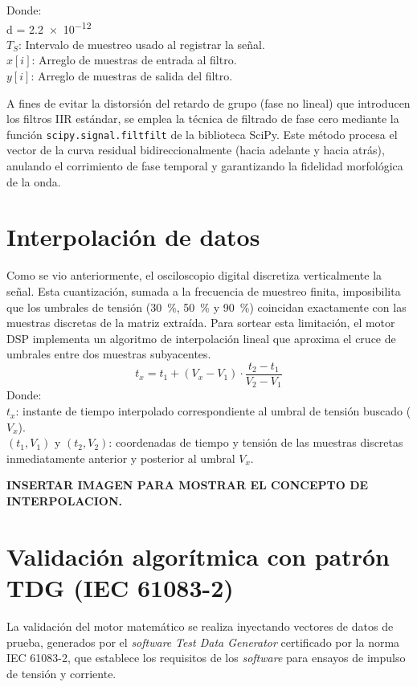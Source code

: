 \noindent Donde:\\
d = \SI{2.2e-12}{}\\
$T_S$: Intervalo de muestreo usado al registrar la señal.\\
$x[i]$: Arreglo de muestras de entrada al filtro.\\
$y[i]$: Arreglo de muestras de salida del filtro.


A fines de evitar la distorsión del retardo de grupo (fase no lineal) que introducen los filtros IIR estándar, se emplea la técnica de filtrado de fase cero mediante la función \texttt{scipy.signal.filtfilt} de la biblioteca SciPy. Este método procesa el vector de la curva residual bidireccionalmente (hacia adelante y hacia atrás), anulando el corrimiento de fase temporal y garantizando la fidelidad morfológica de la onda.

\section{Interpolación de datos}
Como se vio anteriormente, el osciloscopio digital discretiza verticalmente la señal. Esta cuantización, sumada a la frecuencia de muestreo finita, imposibilita que los umbrales de tensión (\SI{30}{\percent}, \SI{50}{\percent} y \SI{90}{\percent}) coincidan exactamente con las muestras discretas de la matriz extraída. Para sortear esta limitación, el motor DSP implementa un algoritmo de interpolación lineal que aproxima el cruce de umbrales entre dos muestras subyacentes.
\begin{equation}
    t_x = t_1 + (V_x - V_1) \cdot \frac{t_2 - t_1}{V_2 - V_1}
    \label{eq:linear_interp}
\end{equation}
Donde:\\
$t_x$: instante de tiempo interpolado correspondiente al umbral de tensión buscado ($V_x$).\\
$(t_1, V_1)$ y $(t_2, V_2)$: coordenadas de tiempo y tensión de las muestras discretas inmediatamente anterior y posterior al umbral $V_x$.

\textbf{INSERTAR IMAGEN PARA MOSTRAR EL CONCEPTO DE INTERPOLACION.}

\section{Validación algorítmica con patrón TDG (IEC 61083-2)}

La validación del motor matemático se realiza inyectando vectores de datos de prueba, generados por el \textit{software} \textit{Test Data Generator} certificado por la norma IEC 61083-2, que establece los requisitos de los \textit{software} para ensayos de impulso de tensión y corriente.

